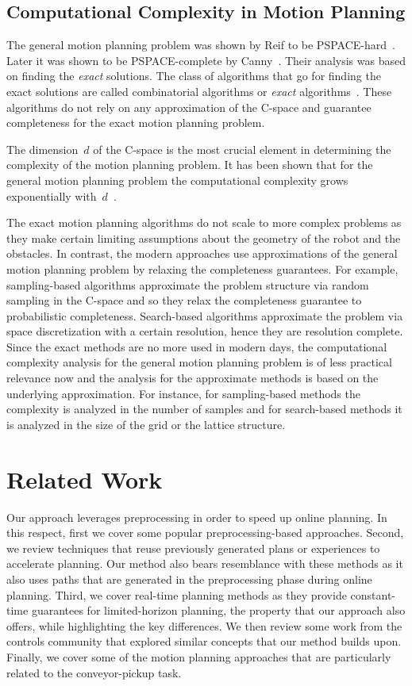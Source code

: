 \documentclass[a4paper]{report}
\begin{document}
\section{Computational Complexity in Motion Planning}
The general motion planning problem was shown by Reif to be PSPACE-hard~\cite{reif1979complexity}. Later it was shown to be PSPACE-complete by Canny~\cite{canny1988complexity}. Their analysis was based on finding the \emph{exact} solutions. The class of algorithms that go for finding the exact solutions are called combinatorial algorithms or \emph{exact} algorithms~\cite{lavalle2006planning}. These algorithms do not rely on any approximation of the C-space and guarantee completeness for the exact motion planning problem.

The dimension~$d$ of the C-space is the most crucial element in determining the complexity of the motion planning problem. It has been shown that for the general motion planning problem the computational complexity grows exponentially with~$d$~\cite{chazelle1991singly}.

The exact motion planning algorithms do not scale to more complex problems as they make certain limiting assumptions about the geometry of the robot and the obstacles. In contrast, the modern approaches use approximations of the general motion planning problem by relaxing the completeness guarantees. For example, sampling-based algorithms approximate the problem structure via random sampling in the C-space and so they relax the completeness guarantee to probabilistic completeness. Search-based algorithms approximate the problem via space discretization with a certain resolution, hence they are resolution complete.
Since the exact methods are no more used in modern days, the computational complexity analysis for the general motion planning problem is of less practical relevance now and the analysis for the approximate methods is based on the underlying approximation. For instance, for sampling-based methods the complexity is analyzed in the number of samples and for search-based methods it is analyzed in the size of the grid or the lattice structure.


\newpage
\chapter{Related Work}
\label{sec:rel}
Our approach leverages preprocessing in order to speed up online planning. In this respect, first we cover some popular preprocessing-based approaches. Second, we review techniques that reuse previously generated plans or experiences to accelerate planning. Our method also bears resemblance with these methods as it also uses paths that are generated in the preprocessing phase during online planning. Third, we cover real-time planning methods as they provide constant-time guarantees for limited-horizon planning, the property that our approach also offers, while highlighting the key differences. We then review some work from the controls community that explored similar concepts that our method builds upon. Finally, we cover some of the motion planning approaches that are particularly related to the conveyor-pickup task.
\end{document}
